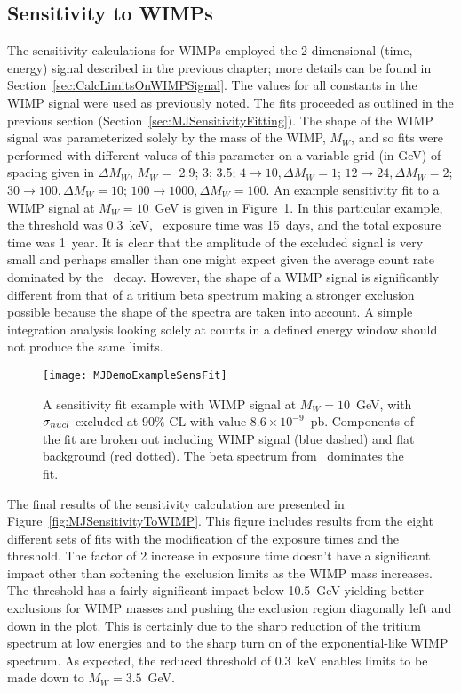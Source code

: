		\subsection{Sensitivity to WIMPs}
		\label{sec:MJSensitivityToWIMP}
		
	The sensitivity calculations for WIMPs employed the 2-dimensional (time, energy) signal described in the previous chapter; more details can be found in Section~\ref{sec:CalcLimitsOnWIMPSignal}.  The values for all constants in the WIMP signal were used as previously noted.  The fits proceeded as outlined in the previous section (Section~\ref{sec:MJSensitivityFitting}).  The shape of the WIMP signal was parameterized solely by the mass of the WIMP, $M_{W}$, and so fits were performed with different values of this parameter on a variable grid (in GeV) of spacing given in $\Delta M_{W}$, $M_{W}=$ 2.9; 3; 3.5; $4\to10, \Delta M_{W} = 1$; $12\to24, \Delta M_{W} = 2$; $30\to100, \Delta M_{W} = 10$; $100\to1000, \Delta M_{W} = 100$.  An example sensitivity fit to a WIMP signal at $M_{W}=10$~GeV is given in Figure~\ref{fig:MJSensitivityToWIMPExample}.  In this particular example, the threshold was 0.3~keV, \hthree~exposure time was 15~days, and the total exposure time was 1~year.  It is clear that the amplitude of the excluded signal is very small and perhaps smaller than one might expect given the average count rate dominated by the \hthree~decay.  However, the shape of a WIMP signal is significantly different from that of a tritium beta spectrum making a stronger exclusion possible because the shape of the spectra are taken into account.  A simple integration analysis looking solely at counts in a defined energy window should not produce the same limits.  
		
			\begin{figure}
				\centering
				\texttt{[image: MJDemoExampleSensFit]}
				\caption[\MJ~\minmod WIMP sensitivity fit example.]{A sensitivity fit example with WIMP  
				signal at $M_{W}=10$~GeV, with $\sigma_{nucl}$ excluded at 90\% CL with value
				 $8.6\times10^{-9}$~pb.  Components of the fit are broken out including WIMP 
				 signal (blue dashed) and flat background (red dotted).  The beta spectrum from \hthree~dominates the fit.}
				\label{fig:MJSensitivityToWIMPExample}
			\end{figure}
	
	The final results of the sensitivity calculation are presented in Figure~\ref{fig:MJSensitivityToWIMP}.  This figure includes results from the eight different sets of fits with the modification of the exposure times and the threshold.  The factor of 2 increase in exposure time doesn't have a significant impact other than softening the exclusion limits as the WIMP mass increases.  The threshold has a fairly significant impact below 10.5~GeV yielding better exclusions for WIMP masses and pushing the exclusion region diagonally left and down in the plot.  This is certainly due to the sharp reduction of the tritium spectrum at low energies and to the sharp turn on of the exponential-like WIMP spectrum.  As expected, the reduced threshold of 0.3~keV enables limits to be made down to $M_{W}=3.5$~GeV.  
	
